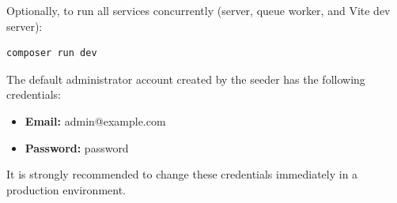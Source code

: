 Optionally, to run all services concurrently (server, queue worker, and Vite dev server):

\begin{verbatim}
composer run dev
\end{verbatim}

The default administrator account created by the seeder has the following credentials:

\begin{itemize}
    \item \textbf{Email:} admin@example.com
    \item \textbf{Password:} password
\end{itemize}

It is strongly recommended to change these credentials immediately in a production environment.
